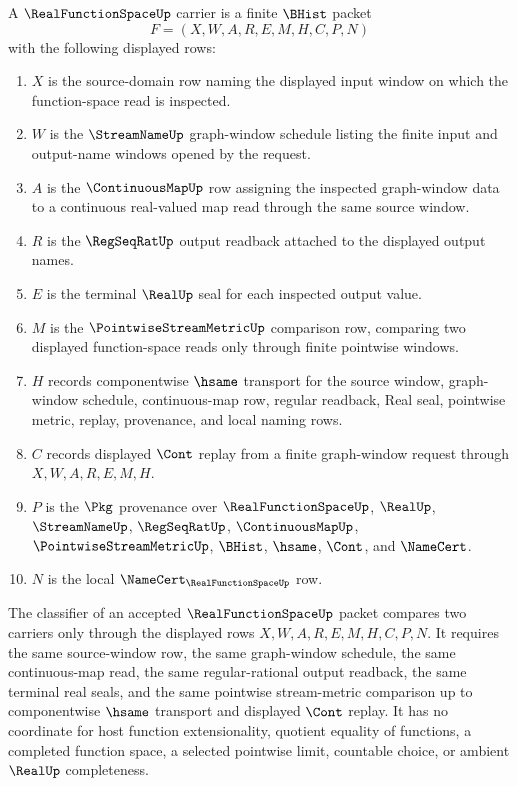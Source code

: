 \begin{definition}\label{def:real-function-space-carrier}
A $\RealFunctionSpaceUp$ carrier is a finite $\BHist$ packet
$$
F=(X,W,A,R,E,M,H,C,P,N)
$$
with the following displayed rows:
\begin{enumerate}
\item $X$ is the source-domain row naming the displayed input window on which the function-space read is inspected.
\item $W$ is the $\StreamNameUp$ graph-window schedule listing the finite input and output-name windows opened by the request.
\item $A$ is the $\ContinuousMapUp$ row assigning the inspected graph-window data to a continuous real-valued map read through the same source window.
\item $R$ is the $\RegSeqRatUp$ output readback attached to the displayed output names.
\item $E$ is the terminal $\RealUp$ seal for each inspected output value.
\item $M$ is the $\PointwiseStreamMetricUp$ comparison row, comparing two displayed function-space reads only through finite pointwise windows.
\item $H$ records componentwise $\hsame$ transport for the source window, graph-window schedule, continuous-map row, regular readback, Real seal, pointwise metric, replay, provenance, and local naming rows.
\item $C$ records displayed $\Cont$ replay from a finite graph-window request through $X,W,A,R,E,M,H$.
\item $P$ is the $\Pkg$ provenance over $\RealFunctionSpaceUp$, $\RealUp$, $\StreamNameUp$, $\RegSeqRatUp$, $\ContinuousMapUp$, $\PointwiseStreamMetricUp$, $\BHist$, $\hsame$, $\Cont$, and $\NameCert$.
\item $N$ is the local $\NameCert_{\RealFunctionSpaceUp}$ row.
\end{enumerate}
\end{definition}

\begin{definition}\label{def:real-function-space-classifier}
The classifier of an accepted $\RealFunctionSpaceUp$ packet compares two carriers only through the displayed rows $X,W,A,R,E,M,H,C,P,N$. It requires the same source-window row, the same graph-window schedule, the same continuous-map read, the same regular-rational output readback, the same terminal real seals, and the same pointwise stream-metric comparison up to componentwise $\hsame$ transport and displayed $\Cont$ replay. It has no coordinate for host function extensionality, quotient equality of functions, a completed function space, a selected pointwise limit, countable choice, or ambient $\RealUp$ completeness.
\end{definition}

